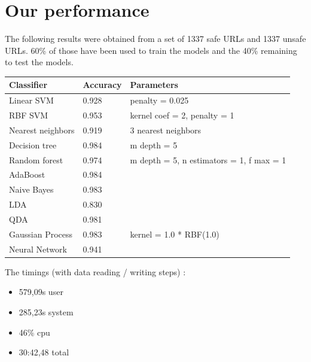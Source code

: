\documentclass[conference,11pt]{IEEEtran}
\begin{document}
\section{Our performance}
The following results were obtained from a set of 1337 safe URLs and 1337 unsafe
URLs. 60\% of those have been used to train the models and the 40\% remaining to
test the models.

\begin{table}[]
  \centering
  \begin{tabular}{|l|l|l|}
  \hline
    Classifier        & Accuracy & Parameters \\ \hline
    Linear SVM        & 0.928    & penalty = 0.025\\ \hline
    RBF SVM           & 0.953    & kernel coef = 2, penalty = 1\\ \hline
    Nearest neighbors & 0.919    & 3 nearest neighbors\\ \hline
    Decision tree     & 0.984    & m depth = 5\\ \hline
    Random forest     & 0.974    & m depth = 5, n estimators = 1, f max = 1\\ \hline
    AdaBoost          & 0.984    & \\ \hline
    Naive Bayes       & 0.983    & \\ \hline
    LDA               & 0.830    & \\ \hline
    QDA               & 0.981    & \\ \hline
    Gaussian Process  & 0.983    & kernel = 1.0 * RBF(1.0)\\ \hline
    Neural Network    & 0.941    & \\ \hline
  \end{tabular}
\end{table}

The timings (with data reading / writing steps) :
\begin{itemize}
  \item 579,09s user
  \item 285,23s system
  \item 46\% cpu
  \item 30:42,48 total
\end{itemize}
\end{document}
